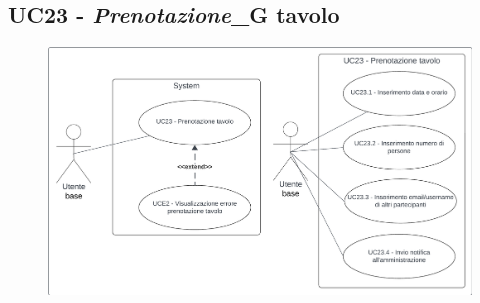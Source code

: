 \subsection{UC23 - \textit{Prenotazione}_G tavolo}\label{usecase:23}

\begin{figure}[H]
  \centering
  \includegraphics[width=0.9\linewidth]{ucd/UCD23.png}
\end{figure}

